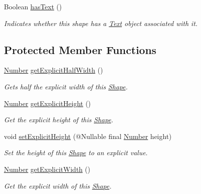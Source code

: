 \begin{DoxyCompactItemize}
Boolean \hyperlink{classcom_1_1aarrelaakso_1_1drawl_1_1_shape_a037a5515b2a6e1df1d1981aa5516e78e}{has\+Text} ()
\begin{DoxyCompactList}\small\item\em Indicates whether this shape has a \hyperlink{classcom_1_1aarrelaakso_1_1drawl_1_1_text}{Text} object associated with it. \end{DoxyCompactList}\end{DoxyCompactItemize}
\subsection*{Protected Member Functions}
\begin{DoxyCompactItemize}
\item 
\hyperlink{interfacecom_1_1aarrelaakso_1_1drawl_1_1_number}{Number} \hyperlink{classcom_1_1aarrelaakso_1_1drawl_1_1_shape_a3acdc2fd1944e2efacd0bfbb8aefe89b}{get\+Explicit\+Half\+Width} ()
\begin{DoxyCompactList}\small\item\em Gets half the explicit width of this \hyperlink{classcom_1_1aarrelaakso_1_1drawl_1_1_shape}{Shape}. \end{DoxyCompactList}\item 
\hyperlink{interfacecom_1_1aarrelaakso_1_1drawl_1_1_number}{Number} \hyperlink{classcom_1_1aarrelaakso_1_1drawl_1_1_shape_a48917787cedbfd447cd37edbb59a1145}{get\+Explicit\+Height} ()
\begin{DoxyCompactList}\small\item\em Get the explicit height of this \hyperlink{classcom_1_1aarrelaakso_1_1drawl_1_1_shape}{Shape}. \end{DoxyCompactList}\item 
void \hyperlink{classcom_1_1aarrelaakso_1_1drawl_1_1_shape_a3680a63cef0d766132d1f64813ca8eca}{set\+Explicit\+Height} (@Nullable final \hyperlink{interfacecom_1_1aarrelaakso_1_1drawl_1_1_number}{Number} height)
\begin{DoxyCompactList}\small\item\em Set the height of this \hyperlink{classcom_1_1aarrelaakso_1_1drawl_1_1_shape}{Shape} to an explicit value. \end{DoxyCompactList}\item 
\hyperlink{interfacecom_1_1aarrelaakso_1_1drawl_1_1_number}{Number} \hyperlink{classcom_1_1aarrelaakso_1_1drawl_1_1_shape_aca08f18bbe102a5cf6a77cb746d42875}{get\+Explicit\+Width} ()
\begin{DoxyCompactList}\small\item\em Get the explicit width of this \hyperlink{classcom_1_1aarrelaakso_1_1drawl_1_1_shape}{Shape}. \end{DoxyCompactList}\item 

\end{DoxyCompactItemize}
